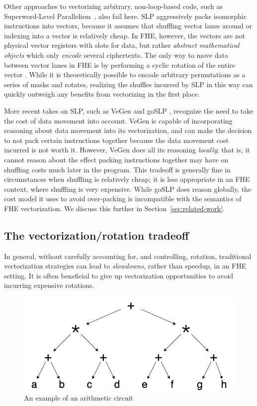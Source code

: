 Other approaches to vectorizing arbitrary, non-loop-based code, such as Superword-Level Parallelism~\cite{SLP}, also fail here.
SLP aggressively packs isomorphic instructions into vectors, because it assumes that shuffling vector lanes around or indexing into a vector is relatively cheap.
In FHE, however, the vectors are not physical vector registers with slots for data, but rather {\em abstract mathematical objects} which only {\em encode} several ciphertexts.
The only way to move data between vector lanes in FHE is by performing a cyclic rotation of the entire vector .
While it is theoretically possible to encode arbitrary permutations as a series of masks and rotates, realizing the shuffles incurred by SLP in this way can quickly outweigh any benefits from vectorizing in the first place. 

More recent takes on SLP, such as VeGen \cite{VeGen} and goSLP \cite{goSLP}, recognize the need to take the cost of data movement into account.
VeGen is capable of incorporating reasoning about data movement into its vectorization, and can make the decision to not pack certain instructions together because the data movement cost incurred is not worth it.
However, VeGen does all its reasoning {\em locally}; that is, it cannot reason about the effect packing instructions together may have on shuffling costs much later in the program. This tradeoff is generally fine in circumstances when shuffling is relatively cheap; it is less appropriate in an FHE context, where shuffling is very expensive.
While goSLP does reason globally, the cost model it uses to avoid over-packing is incompatible with the semantics of FHE vectorization.
We discuss this further in Section~\ref{sec:related-work}.

\subsection*{The vectorization/rotation tradeoff}

In general, without carefully accounting for, and controlling, rotation, traditional vectorization strategies can lead to {\em slowdowns}, rather than speedup, in an FHE setting. It is often beneficial to give up vectorization opportunities to avoid incurring expensive rotations.

\begin{figure}
    \includegraphics[width=0.6\linewidth]{figures/compilation_overview/coyote_running_example.drawio.png}
    \vspace{-1em}
    \caption{An example of an arithmetic circuit}\label{fig:example-circuit}
\end{figure}


